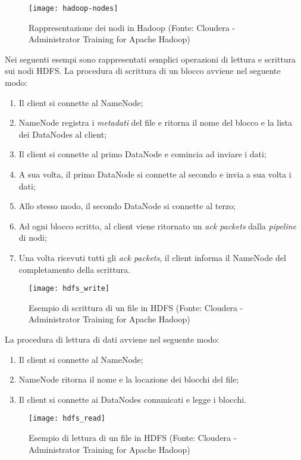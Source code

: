 \begin{figure}[!h]
	\centering
	\texttt{[image: hadoop-nodes]}
	\caption{Rappresentazione dei nodi in Hadoop (Fonte: Cloudera - Administrator Training for Apache Hadoop)}
\end{figure}
Nei seguenti esempi sono rappresentati semplici operazioni di lettura e scrittura sui nodi HDFS.
La procedura di scrittura di un blocco avviene nel seguente modo:
\begin{enumerate}
	\item Il client si connette al NameNode;
	\item NameNode registra i \textit{metadati} del file e ritorna il nome del blocco e la lista dei DataNodes al client;
	\item Il client si connette al primo DataNode e comincia ad inviare i dati;
	\item A sua volta, il primo DataNode si connette al secondo e invia a sua volta i dati;
	\item Allo stesso modo, il secondo DataNode si connette al terzo;
	\item Ad ogni blocco scritto, al client viene ritornato un \textit{ack packets} dalla \textit{pipeline} di nodi;
	\item Una volta ricevuti tutti gli \textit{ack packets}, il client informa il NameNode del completamento della scrittura.
\end{enumerate} 
\begin{figure}[!h]
	\centering
	\texttt{[image: hdfs\_write]}
	\caption{Esempio di scrittura di un file in HDFS (Fonte: Cloudera - Administrator Training for Apache Hadoop)}
\end{figure}
La procedura di lettura di dati avviene nel seguente modo:
\begin{enumerate}
	\item Il client si connette al NameNode;
	\item NameNode ritorna il nome e la locazione dei blocchi del file;
	\item Il client si connette ai DataNodes comunicati e legge i blocchi.
\end{enumerate}
\begin{figure}[!h]
	\centering
	\texttt{[image: hdfs\_read]}
	\caption{Esempio di lettura di un file in HDFS (Fonte: Cloudera - Administrator Training for Apache Hadoop)}
\end{figure}

